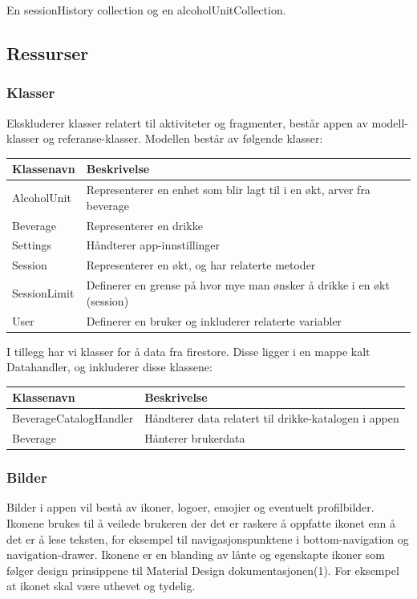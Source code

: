 En sessionHistory collection og en alcoholUnitCollection.

\subsection{Ressurser}

\subsubsection{Klasser}
Ekskluderer klasser relatert til aktiviteter og fragmenter, består appen av modell-klasser og referanse-klasser. Modellen består av følgende klasser:

\begin{tabular}{ | m{4cm} | m{12cm} | } 
    \hline
    \textbf{Klassenavn} & \textbf{Beskrivelse} \\
    \hline
    AlcoholUnit &
    Representerer en enhet som blir lagt til i en økt, arver fra beverage \\
    \hline
    Beverage &
    Representerer en drikke \\
    \hline
    Settings &
    Håndterer app-innstillinger \\
    \hline
    Session &
    Representerer en økt, og har relaterte metoder \\
    \hline
    SessionLimit &
    Definerer en grense på hvor mye man ønsker å drikke i en økt (session) \\
    \hline
    User &
    Definerer en bruker og inkluderer relaterte variabler \\
    \hline
\end{tabular}

I tillegg har vi klasser for å data fra firestore. Disse ligger i en mappe kalt Datahandler, og inkluderer disse klassene:

\begin{tabular}{ | m{4cm} | m{12cm} | } 
    \hline
    \textbf{Klassenavn} & \textbf{Beskrivelse} \\
    \hline
    BeverageCatalogHandler &
    Håndterer data relatert til drikke-katalogen i appen \\
    \hline
    Beverage &
    Hånterer brukerdata \\
    \hline
\end{tabular}

\subsubsection{Bilder}
Bilder i appen vil bestå av ikoner, logoer, emojier og eventuelt profilbilder. Ikonene brukes til å veilede brukeren der det er raskere å oppfatte ikonet enn å det er å lese teksten, for eksempel til navigasjonspunktene i bottom-navigation og navigation-drawer. Ikonene er en blanding av lånte og egenskapte ikoner som følger design prinsippene til Material Design dokumentasjonen(1). For eksempel at ikonet skal være uthevet og tydelig.

